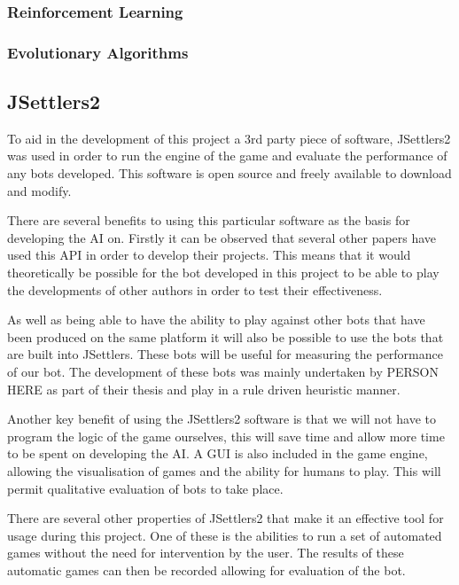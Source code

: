 \documentclass[]{article}
\begin{document}
\subsubsection{Reinforcement Learning}



\subsubsection{Evolutionary Algorithms}



\subsection{JSettlers2}
To aid in the development of this project a 3rd party piece of software, JSettlers2 was used in order to run the engine of the game and evaluate the performance of any bots developed. This software is open source and freely available to download and modify.

\par There are several benefits to using this particular software as the basis for developing the AI on. Firstly it can be observed that several other papers have used this API in order to develop their projects. This means that it would theoretically be possible for the bot developed in this project to be able to play the developments of other authors in order to test their effectiveness. 

\par As well as being able to have the ability to play against other bots that have been produced on the same platform it will also be possible to use the bots that are built into JSettlers. These bots will be useful for measuring the performance of our bot. The development of these bots was mainly undertaken by PERSON HERE as part of their thesis and play in a rule driven heuristic manner.

\par Another key benefit of using the JSettlers2 software is that we will not have to program the logic of the game ourselves, this will save time and allow more time to be spent on developing the AI. A GUI is also included in the game engine, allowing the visualisation of games and the ability for humans to play. This will permit qualitative evaluation of bots to take place.

\par There are several other properties of JSettlers2 that make it an effective tool for usage during this project. One of these is the abilities to run a set of automated games without the need for intervention by the user. The results of these automatic games can then be recorded allowing for evaluation of the bot. 
\end{document}
